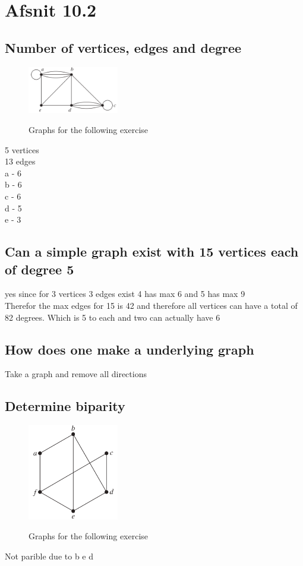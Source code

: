 \documentclass[12pt, a4paper]{report}
\begin{document}
	\section{Afsnit 10.2}
		\setcounter{subsection}{1}
		\subsection{Number of vertices, edges and degree}
			\begin{figure}[h!]
				\centering
				\includegraphics[width=150px]{assets/10,3,2.png}
				\label{10,3,2}
				\caption{Graphs for the following exercise}
			\end{figure}
			5 vertices\\
			13 edges\\
			a - 6\\
			b - 6\\
			c - 6\\
			d - 5\\
			e - 3
		\setcounter{subsection}{4}
		\subsection{Can a simple graph exist with 15 vertices each of degree 5}
			yes since for 3 vertices 3 edges exist 4 has max 6 and 5 has max 9\\
			Therefor the max edges for 15 is 42 and therefore all vertices can have a total of 82 degrees. Which is 5 to each and two can actually have 6\\
		\setcounter{subsection}{10}
		\subsection{How does one make a underlying graph}
			Take a graph and remove all directions
		\setcounter{subsection}{25}\clearpage
		\subsection{Determine biparity}
			\begin{figure}[h!]
				\centering
				\includegraphics[width=150px]{assets/10,2,25.png}
				\label{10,2,25}
				\caption{Graphs for the following exercise}
			\end{figure}
			Not parible due to b e d
\end{document}
